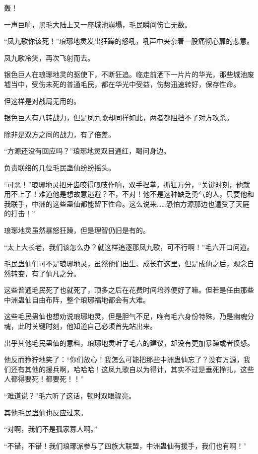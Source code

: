 
\begin{this_body}

轰！

一声巨响，黑毛大陆上又一座城池崩塌，毛民瞬间伤亡无数。

“凤九歌你该死！”琅琊地灵发出狂躁的怒吼，吼声中夹杂着一股痛彻心扉的悲意。

凤九歌冷笑，再次飞射而去。

银色巨人在琅琊地灵的驱使下，不断狂追。临走前洒下一片片的华光，那些城池废墟当中，受伤未死的普通毛民，都在华光中受益，伤势迅速转好，保存性命。

但这样是对战局无用的。

银色巨人有八转战力，但是凤九歌却同样如此，两者都阻挡不了对方攻杀。

除非是双方之间的战力，有了倍差。

“方源还没有回应吗？”琅琊地灵双目通红，喝问身边。

负责联络的几位毛民蛊仙纷纷摇头。

“可恶！”琅琊地灵把牙齿咬得嘎吱作响，双手捏拳，抓狂万分，“关键时刻，他就用不上了！难道他是想故意逃避？不，不对！他不是这种缺乏勇气的人，只要他和我联手，中洲的这些蛊仙都能留下性命。这么说来……恐怕方源那边也遭受了天庭的打击！”

琅琊地灵虽然暴怒狂躁，但是理智仍旧是有的。

“太上大长老，我们该怎么办？就这样追逐那凤九歌，可不行啊！”毛六开口问道。

毛民蛊仙们可不是琅琊地灵，虽然他们出生、成长在这里，但是成仙之后，观念自然转变，有了仙凡之分。

这些普通毛民死了也就死了，顶多之后在花费时间培养便好了嘛。但若是任由那些中洲蛊仙自由布阵，整个琅琊福地都会有大难。

这些毛民蛊仙也想劝说琅琊地灵，但是胆气不足，唯有毛六身份特殊，乃是幽魂分魂，此时关键时刻，他知道自己必须首先站出来。

出乎其他毛民蛊仙的意料，琅琊地灵听了毛六的建议，却没有更加暴躁或者愤怒。

他反而狰狞地笑了：“你们放心！我怎么可能把那些中洲蛊仙忘了？没有方源，我们还有其他的援兵啊，哈哈哈！这凤九歌自以为得计，其实不过是垂死挣扎，这些人都得要死！都要死！！”

“难道说？”毛六听了这话，顿时双眼骤亮。

其他毛民蛊仙也反应过来。

“对啊，我们不是孤家寡人啊。”

“不错，不错！我们琅琊派参与了四族大联盟，中洲蛊仙有援手，我们也有啊！”


\end{this_body}
